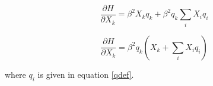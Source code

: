 \begin{displaymath}
    \frac{\partial H}{\partial X_{k}} = \beta^{2}X_{k}q_{k} + \beta^{2}q_{k}\sum_{i}X_{i}q_{i}
\end{displaymath}

\begin{equation}
    \frac{\partial H}{\partial X_{k}} = \beta^{2}q_{k}\left(X_{k} + \sum_{i}X_{i}q_{i}\right)
\label{combd}
\end{equation}

\noindent where $q_{i}$ is given in equation \ref{qdef}.





